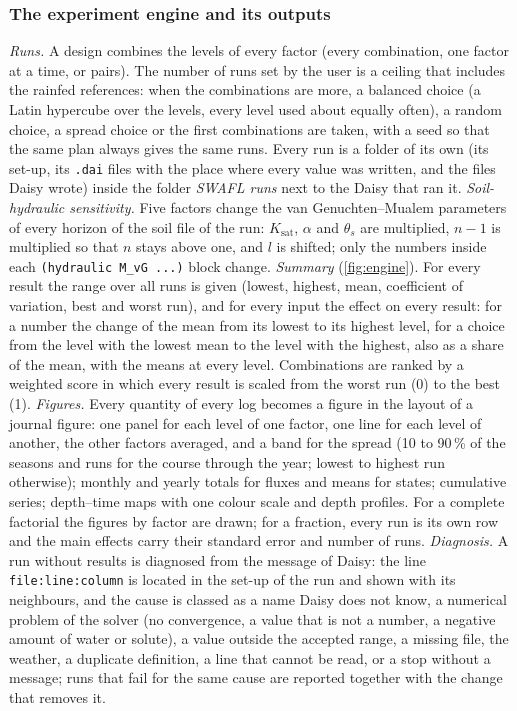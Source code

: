 \documentclass[preprint,12pt]{elsarticle}
\begin{document}
\subsubsection{The experiment engine and its outputs}\label{sec:engine}
\emph{Runs.} A design combines the levels of every factor (every combination, one factor at a time, or pairs). The number of runs set by the user is a ceiling that includes the rainfed references: when the combinations are more, a balanced choice (a Latin hypercube over the levels, every level used about equally often), a random choice, a spread choice or the first combinations are taken, with a seed so that the same plan always gives the same runs. Every run is a folder of its own (its set-up, its \texttt{.dai} files with the place where every value was written, and the files Daisy wrote) inside the folder \emph{SWAFL runs} next to the Daisy that ran it.
\emph{Soil-hydraulic sensitivity.} Five factors change the van Genuchten--Mualem parameters of every horizon of the soil file of the run: $K_\mathrm{sat}$, $\alpha$ and $\theta_s$ are multiplied, $n-1$ is multiplied so that $n$ stays above one, and $l$ is shifted; only the numbers inside each \texttt{(hydraulic M\_vG ...)} block change.
\emph{Summary} (\cref{fig:engine}). For every result the range over all runs is given (lowest, highest, mean, coefficient of variation, best and worst run), and for every input the effect on every result: for a number the change of the mean from its lowest to its highest level, for a choice from the level with the lowest mean to the level with the highest, also as a share of the mean, with the means at every level. Combinations are ranked by a weighted score in which every result is scaled from the worst run (0) to the best (1).
\emph{Figures.} Every quantity of every log becomes a figure in the layout of a journal figure: one panel for each level of one factor, one line for each level of another, the other factors averaged, and a band for the spread (10 to 90\,\% of the seasons and runs for the course through the year; lowest to highest run otherwise); monthly and yearly totals for fluxes and means for states; cumulative series; depth--time maps with one colour scale and depth profiles. For a complete factorial the figures by factor are drawn; for a fraction, every run is its own row and the main effects carry their standard error and number of runs.
\emph{Diagnosis.} A run without results is diagnosed from the message of Daisy: the line \texttt{file:line:column} is located in the set-up of the run and shown with its neighbours, and the cause is classed as a name Daisy does not know, a numerical problem of the solver (no convergence, a value that is not a number, a negative amount of water or solute), a value outside the accepted range, a missing file, the weather, a duplicate definition, a line that cannot be read, or a stop without a message; runs that fail for the same cause are reported together with the change that removes it.
\end{document}
